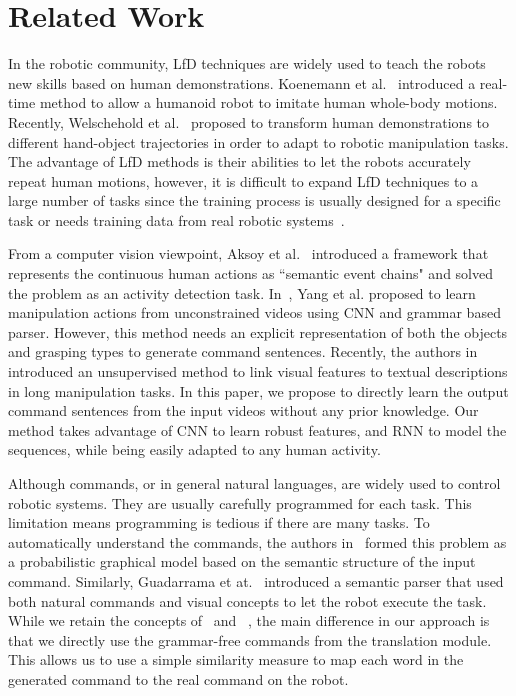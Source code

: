 \section{Related Work} \label{Sec:rw}

In the robotic community, LfD techniques are widely used to teach the robots new skills based on human demonstrations. Koenemann et al.~\cite{Koenemann2014} introduced a real-time method to allow a humanoid robot to imitate human whole-body motions. Recently, Welschehold et al.~\cite{Welschehold2016} proposed to transform human demonstrations to different hand-object trajectories in order to adapt to robotic manipulation tasks. The advantage of LfD methods is their abilities to let the robots accurately repeat human motions, however, it is difficult to expand LfD techniques to a large number of tasks since the training process is usually designed for a specific task or needs training data from real robotic systems~\cite{Akgun2012}.


From a computer vision viewpoint, Aksoy et al.~\cite{Aksoy2016} introduced a framework that represents the continuous human actions as ``semantic event chains" and solved the problem as an activity detection task. In~\cite{Yang2015}, Yang et al. proposed to learn manipulation actions from unconstrained videos using CNN and grammar based parser. However, this method needs an explicit representation of both the objects and grasping types to generate command sentences. Recently, the authors in~\cite{Aksoy2017} introduced an unsupervised method to link visual features to textual descriptions in long manipulation tasks. In this paper, we propose to directly learn the output command sentences from the input videos without any prior knowledge. Our method takes advantage of CNN to learn robust features, and RNN to model the sequences, while being easily adapted to any human activity.


Although commands, or in general natural languages, are widely used to control robotic systems. They are usually carefully programmed for each task. This limitation means programming is tedious if there are many tasks. To automatically understand the commands, the authors in~\cite{Tellex2011} formed this problem as a probabilistic graphical model based on the semantic structure of the input command. Similarly, Guadarrama et at.~\cite{Guadarrama13} introduced a semantic parser that used both natural commands and visual concepts to let the robot execute the task. While we retain the concepts of~\cite{Tellex2011} and ~\cite{Guadarrama13}, the main difference in our approach is that we directly use the grammar-free commands from the translation module. This allows us to use a simple similarity measure to map each word in the generated command to the real command on the robot.


